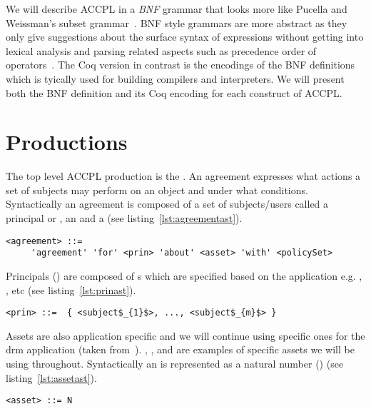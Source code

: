 We will describe \ac{ACCPL} in a \emph{BNF} grammar that looks more like Pucella and Weissman's subset grammar~\cite{pucella2006}. BNF style grammars are more abstract as they only give suggestions about the surface syntax of expressions without getting into lexical analysis and parsing related aspects such as precedence order of operators~\cite{piercesf2011}. The Coq version in contrast is the encodings of the BNF definitions which is tyically used for building compilers and interpreters. We will present both the BNF definition and its Coq encoding for each construct of \ac{ACCPL}. 


\section{Productions} \label{sec:productionast}

The top level \ac{ACCPL} production is the . An agreement expresses what actions a set of subjects may perform on an object and under what conditions. Syntactically an agreement is composed of a set of subjects/users called a principal or , an  and a  (see listing~\ref{lst:agreementast}).

\lstset{language=AST}
\begin{minipage}[c]{0.95\textwidth}
\begin{lstlisting}[frame=single, caption={agreement},label={lst:agreementast}]
<agreement> ::= 
     'agreement' 'for' <prin> 'about' <asset> 'with' <policySet> 
\end{lstlisting}
\end{minipage} 

Principals () are composed of s which are specified based on the application e.g. , , etc (see listing~\ref{lst:prinast}).

\lstset{mathescape, language=AST}  
\begin{lstlisting}[frame=single, caption={prin},label={lst:prinast}]
<prin> ::=  { <subject$_{1}$>, ..., <subject$_{m}$> }
\end{lstlisting}

Assets are also application specific and we will continue using specific ones for the \ac{drm} application (taken from~\cite{pucella2006}). , , and  are examples of specific assets we will be using throughout. Syntactically an  is represented as a natural number () (see listing~\ref{lst:assetast}). 
\lstset{mathescape, language=AST}  
\begin{lstlisting}[frame=single, caption={asset},label={lst:assetast}]
<asset> ::= N
\end{lstlisting}

